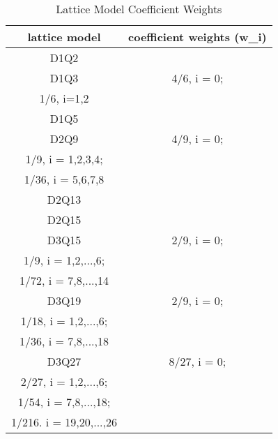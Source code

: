 \documentclass[12pt]{article}
\begin{document}
\begin{table}
\begin{center}
\begin{tabular}{| c | c |}
\hline
lattice model & coefficient weights (w_i)\\
\hline
D1Q2\cite{} & \\
\hline
D1Q3\cite{} & 4/6, i = 0;\\ 1/6, i=1,2\\
\hline
D1Q5\cite{} & \\
\hline
D2Q9\cite{perumal2015review} & 4/9, i = 0;\\ 1/9, i = 1,2,3,4;\\ 1/36, i = 5,6,7,8\\
\hline
D2Q13\cite{} & \\
\hline
D2Q15\cite{} & \\
\hline
D3Q15\cite{perumal2015review} & 2/9, i = 0; \\ 1/9, i = 1,2,...,6; \\ 1/72, i = 7,8,...,14\\
\hline
D3Q19\cite{perumal2015review} & 2/9, i = 0;\\ 1/18, i = 1,2,...,6; \\ 1/36, i = 7,8,...,18\\
\hline
D3Q27\cite{perumal2015review} & 8/27, i = 0; \\ 2/27, i = 1,2,...,6; \\ 1/54, i = 7,8,...,18; \\ 1/216. i = 19,20,...,26 \\
\hline


\end{tabular}
\caption{Lattice Model Coefficient Weights}
\end{center}
\end{table}
\end{document}
